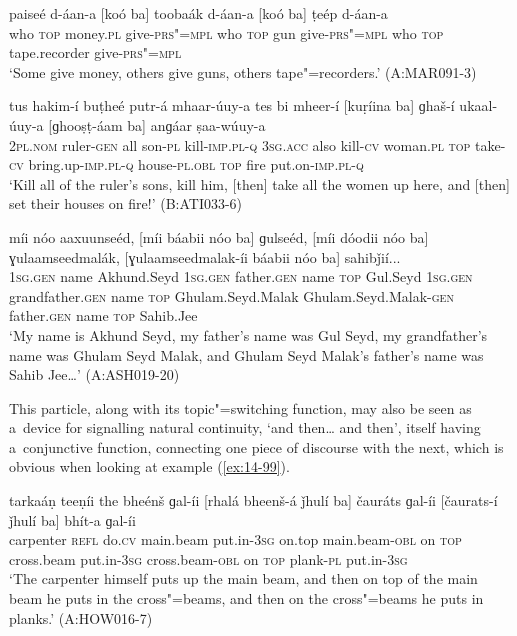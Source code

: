 \begin{exe}
\ex
\label{ex:14-96}
\gll [koó ba] paiseé d-áan-a [koó ba] toobaák  d-áan-a [koó ba] ṭeép d-áan-a\\
who \textsc{top} money.\textsc{pl} give-\textsc{prs"=mpl} who \textsc{top} gun  give-\textsc{prs"=mpl} who \textsc{top} tape.recorder give-\textsc{prs"=mpl} \\
\glt `Some give money, others give guns, others tape"=recorders.' (A:MAR091-3)

\ex
\label{ex:14-97}
\gll tus hakim-í buṭheé putr-á mhaar-úuy-a tes  bi  mheer-í [kuṛíina ba]
ɡhaš-í ukaal-úuy-a  [ɡhooṣṭ-áam ba] anɡáar ṣaa-wúuy-a \\
\textsc{2pl.nom} ruler-\textsc{gen} all son-\textsc{pl} kill-\textsc{imp.pl-q} \textsc{3sg.acc} also  kill-\textsc{cv} woman.\textsc{pl} \textsc{top} take-\textsc{cv} bring.up-\textsc{imp.pl-q}  house-\textsc{pl.obl} \textsc{top} fire put.on-\textsc{imp.pl-q } \\
\glt `Kill all of the ruler's sons, kill him, [then] take all the women up here, and [then] set their houses on fire!' (B:ATI033-6)

\ex
\label{ex:14-98}
\gll míi nóo aaxuunseéd, [míi báabii nóo ba]  ɡulseéd, [míi
  dóodii nóo ba] ɣulaamseedmalák, [ɣulaamseedmalak-íi báabii nóo ba] sahibǰií... \\
\textsc{1sg.gen} name Akhund.Seyd \textsc{1sg.gen} father.\textsc{gen} name \textsc{top} Gul.Seyd \textsc{1sg.gen} grandfather.\textsc{gen} name \textsc{top} Ghulam.Seyd.Malak Ghulam.Seyd.Malak-\textsc{gen} father.\textsc{gen} name \textsc{top} Sahib.Jee  \\
\glt `My name is Akhund Seyd, my father's name was Gul Seyd, my grandfather's name was Ghulam Seyd Malak, and Ghulam Seyd Malak's father's name was Sahib Jee{\ldots}' (A:ASH019-20)
\end{exe}

This particle, along with its topic"=switching function, may also be seen as a~device for signalling natural continuity, `and then{\ldots} and then', itself having a~conjunctive function, connecting one piece of discourse with the next, which is obvious when looking at example (\ref{ex:14-99}).

\begin{exe}
\ex
\label{ex:14-99}
\gll tarkaáṇ teeṇíi the bheénš ɡal-íi  [rhalá bheenš-á ǰhulí ba] čauráts ɡal-íi  [čaurats-í ǰhulí ba] bhít-a ɡal-íi \\
carpenter \textsc{refl} do.\textsc{cv} main.beam put.in-\textsc{3sg }  on.top main.beam-\textsc{obl} on \textsc{top} cross.beam put.in-\textsc{3sg}  cross.beam-\textsc{obl} on \textsc{top} plank-\textsc{pl} put.in-\textsc{3sg} \\
\glt `The carpenter himself puts up the main beam, and then on top of the main beam he puts in the cross"=beams, and then on the cross"=beams he puts in planks.' (A:HOW016-7)
\end{exe}

